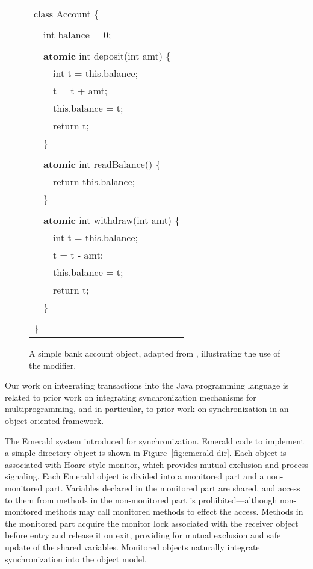 \begin{figure}
{\ttfamily\sis\small%
\begin{tabular}{l}
class Account \{\\
\\
~~int balance = 0;\\
\\
~~{\bf atomic} int deposit(int amt) \{\\
~~~~int t = this.balance;\\
~~~~t = t + amt;\\
~~~~this.balance = t;\\
~~~~return t;\\
~~\}\\
\\
~~{\bf atomic} int readBalance() \{\\
~~~~return this.balance;\\
~~\}\\
\\
~~{\bf atomic} int withdraw(int amt) \{\\
~~~~int t = this.balance;\\
~~~~t = t - amt;\\
~~~~this.balance = t;\\
~~~~return t;\\
~~\}\\
\\
\}\\
\end{tabular}
}\vspace{.2in}
\caption[A simple bank account object
  illustrating the use of the \atomic modifier.]
 {A simple bank account object, adapted from \cite{FlanaganQa03},
  illustrating the use of the \atomic modifier.}
\label{fig:atomic}
\end{figure}

Our work on integrating transactions into the Java programming
language is related to prior work on integrating synchronization
mechanisms for multiprogramming, and in particular, to prior work on
synchronization in an object-oriented framework.

\label{sec:emerald}
The Emerald system \cite{BlackHuJuLe86,JulSt91} introduced
 for synchronization.  Emerald code to
implement a simple directory object is shown in
Figure~\ref{fig:emerald-dir}.  Each object is associated with
Hoare-style monitor, which provides mutual exclusion and process
signaling.  Each Emerald object is divided into a monitored part and
a non-monitored part.  Variables declared in the monitored part are
shared, and access to them from methods in the non-monitored part is
prohibited---although non-monitored methods may call monitored methods
to effect the access.  Methods in the monitored part acquire the monitor lock
associated with the receiver object before entry and release it on
exit, providing for mutual exclusion and safe update of the shared
variables.  Monitored objects naturally integrate synchronization into
the object model.

